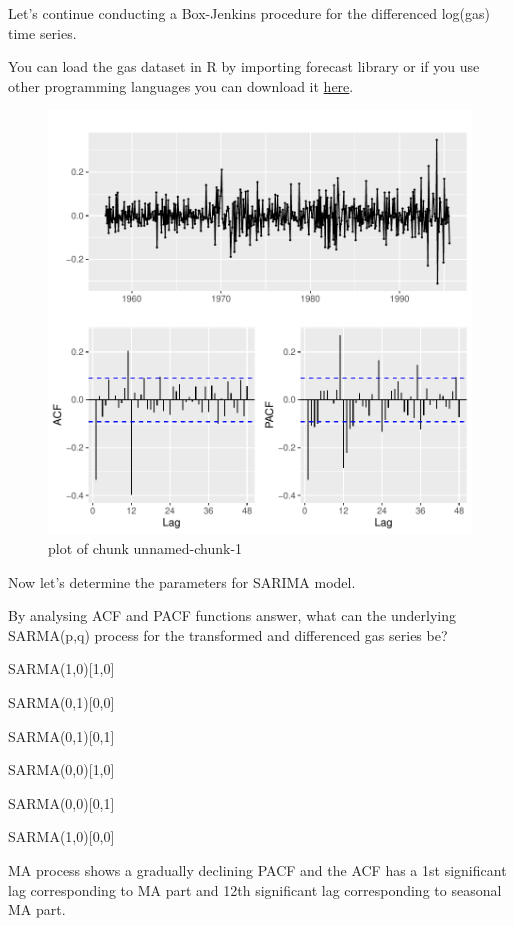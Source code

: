 
\begin{question}
Let's continue conducting a Box-Jenkins procedure for the differenced log(gas) time series.

You can load the gas dataset in R by importing forecast library or if you use other programming languages you can download it \href{https://github.com/vincentarelbundock/Rdatasets/blob/master/csv/forecast/gas.csv}{here}.

\begin{figure}[H]
\centering
\includegraphics{unnamed-chunk-1-1-5.pdf}
\caption{plot of chunk unnamed-chunk-1}
\end{figure}

Now let's determine the parameters for SARIMA model.

By analysing ACF and PACF functions answer, what can the underlying SARMA(p,q) process for the transformed and differenced gas series be?
\begin{answerlist}
  \item SARMA(1,0){[}1,0{]}
  \item SARMA(0,1){[}0,0{]}
  \item SARMA(0,1){[}0,1{]}
  \item SARMA(0,0){[}1,0{]}
  \item SARMA(0,0){[}0,1{]}
  \item SARMA(1,0){[}0,0{]}
\end{answerlist}
\end{question}

\begin{solution}
MA process shows a gradually declining PACF and the ACF has a 1st significant lag corresponding to MA part and 12th significant lag corresponding to seasonal MA part.
\end{solution}

